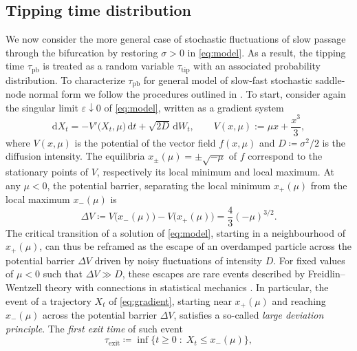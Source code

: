 \documentclass[11pt,a4paper]{article}
\theoremstyle{plain}
\theoremstyle{definition}
\theoremstyle{remark}
\newcommand{\dd}{\mathrm{d}}
\begin{document}
\subsection{Tipping time distribution}\label{subsec:exit}
We now consider the more general case of stochastic fluctuations of slow passage through the bifurcation by restoring $\sigma>0$ in \eqref{eq:model}.
As a result, the tipping time $\tau_{\mathrm{pb}}$ is treated as a random variable $\tau_{\mathrm{tip}}$ with an associated probability distribution. 
To characterize $\tau_{\mathrm{pb}}$ for general model of slow-fast stochastic saddle-node normal form we follow the procedures outlined in \cite{Miller2012,Herbert2017}.
To start, consider again the singular limit $\varepsilon\downarrow0$ of \eqref{eq:model}, written as a gradient system 
%
\begin{equation}\label{eq:gradient}
        \dd X_t=-V'\bigl(X_t,\mu\bigr)\,\dd t+\sqrt{2D}\,\dd W_t,
        \qquad
        V(x,\mu):=\mu x + \frac{x^3}{3},    
\end{equation}
%
where $V(x,\mu)$ is the potential of the vector field $f(x,\mu)$ and $D\coloneqq\sigma^2/2$ is the diffusion intensity.
The equilibria $x_{\pm}(\mu)=\pm\sqrt{-\mu}$ of $f$ correspond to the stationary points of $V$, respectively its local minimum and local maximum.
At any $\mu<0$, the potential barrier, separating the local minimum $x_+(\mu)$ from the local maximum $x_-(\mu)$ is
%
\begin{equation}\label{eq:barrier}
        \Delta V\coloneqq V\bigl(x_-(\mu)\bigr)-V\bigl(x_+(\mu)\bigr) = \frac43(-\mu)^{3/2} .
\end{equation}
%
The critical transition of a solution of \eqref{eq:model}, starting in a neighbourhood of $x_+(\mu)$, can thus be reframed as the escape of an overdamped particle across the potential barrier $\Delta V$ driven by noisy fluctuations of intensity $D$.
For fixed values of $\mu<0$ such that $\Delta V\gg D$, these escapes are rare events described by Freidlin--Wentzell theory \cite{Freidlin2012} with connections in statistical mechanics \cite{Santolin2025}.
In particular, the event of a trajectory $X_t$ of \eqref{eq:gradient}, starting near $x_+(\mu)$ and reaching $x_-(\mu)$ across the potential barrier $\Delta V$, satisfies a so-called \emph{large deviation principle}.
The \emph{first exit time} of such event \cite[\S~$5.5$]{Gardiner2009}  
%
\begin{equation}\label{eq:first_exit}
        \tau_{\mathrm{exit}} \coloneqq \inf\{t\ge0\;:\;X_t\le x_-(\mu)\}, 
\end{equation}
\end{document}
